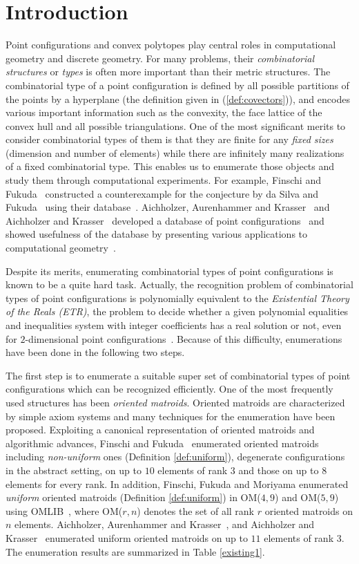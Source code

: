 \documentclass{article}
\begin{document}
\section{Introduction}
Point configurations and convex polytopes play central roles in
computational geometry and discrete geometry.
For many problems, their {\it combinatorial structures} or 
{\it types} is often more important than their metric structures.
The combinatorial type of a point configuration is defined by all possible partitions of the points by a hyperplane 
(the definition given in (\ref{def:covectors})), 
and encodes various important information such as
the convexity, the face lattice of the convex hull and all possible triangulations.
One of the most significant merits to consider combinatorial types of them is that they are finite for any {\it fixed  sizes\/} (dimension and number of elements)
while there are infinitely many realizations of a fixed combinatorial type. 
This enables us to enumerate those objects and study them through 
computational experiments.
For example, Finschi and Fukuda~\cite{FF03} constructed a counterexample 
for the conjecture by da Silva and Fukuda~\cite{dSF98} using their database~\cite{FF}.
Aichholzer, Aurenhammer and Krasser~\cite{AAK02} and Aichholzer and Krasser~\cite{AK06} developed a database of point configurations~\cite{AAK} 
and showed usefulness of the database
by presenting various applications to computational geometry~\cite{AAK02,AK01,AK06}.

Despite its merits, enumerating combinatorial types of point configurations 
is known to be a quite hard task.
Actually, the recognition problem of combinatorial types of point configurations is
polynomially equivalent to the {\it Existential Theory of the Reals (ETR)},
the problem to decide whether a given polynomial equalities and inequalities system with 
integer coefficients has a real solution or not, even for $2$-dimensional point configurations~\cite{M88,S91}.
Because of this difficulty, enumerations have been done in the following two steps.

The first step is to enumerate a suitable super set of combinatorial types of point configurations 
which can be recognized efficiently.
One of the most frequently used structures has been {\it oriented matroids}.
Oriented matroids are characterized by simple axiom systems and many techniques for the enumeration have been
proposed.
Exploiting a canonical representation of oriented matroids and
algorithmic advances, Finschi and Fukuda~\cite{FF02,FF03} enumerated
oriented matroids including {\it non-uniform} ones (Definition \ref{def:uniform}), degenerate configurations in the abstract setting, 
on up to $10$ elements of rank $3$
and those on up to $8$ elements for every rank.  
In addition, Finschi, Fukuda and Moriyama enumerated {\it uniform} oriented matroids (Definition \ref{def:uniform})
in OM($4,9$) and OM($5,9$) using OMLIB~\cite{FF}, 
where OM($r,n$) denotes the set of all rank $r$ oriented matroids on $n$ elements.
Aichholzer, Aurenhammer and Krasser~\cite{AAK02}, and Aichholzer and Krasser~\cite{AK06} enumerated
uniform oriented matroids on up to $11$ elements of rank $3$.
The enumeration results are summarized in Table \ref{existing1}.
 
\end{document}
